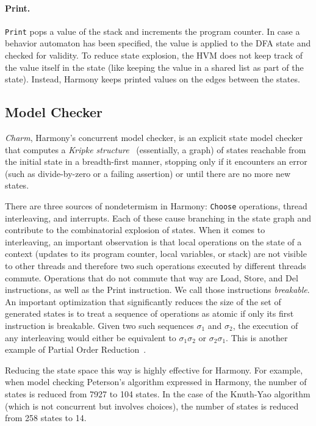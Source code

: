 \documentclass[twocolumn]{article}
\begin{document}
\paragraph{Print.}  \texttt{Print} pops a value of the stack and increments
the program counter.  In case a behavior automaton has been specified, the
value is applied to the DFA state and checked for validity.
To reduce state explosion, the HVM does not keep track of the value itself
in the state (like keeping the value in a shared list as part of the state).
Instead, Harmony keeps printed values on the edges between the states.

\subsection{Model Checker}

\emph{Charm}, Harmony's concurrent model checker, is an explicit state model
checker that computes a \emph{Kripke structure}~\cite{Kripke1963}
(essentially, a graph) of states reachable
from the initial state in a breadth-first manner, stopping only if
it encounters an error (such as divide-by-zero or a failing assertion)
or until there are no more new states.

There are three sources of nondetermism in Harmony: \texttt{Choose}
operations, thread interleaving, and interrupts.
Each of these cause branching in the state graph and contribute
to the combinatorial explosion of states.
When it comes to interleaving, an important observation is that
local operations on the state of a context (updates to its program
counter, local variables, or stack) are not visible to other threads
and therefore two such operations executed by different threads
commute.
Operations that do not commute that way are Load, Store, and Del
instructions, as well as the Print instruction.  We call those
instructions \emph{breakable}.
An important optimization that significantly
reduces the size of the set of generated states is to treat a
sequence of operations as atomic if only its first instruction
is breakable.  Given two such sequences $\sigma_1$ and $\sigma_2$,
the execution of any interleaving would either be equivalent to
$\sigma_1\sigma_2$ or $\sigma_2\sigma_1$.
This is another example of Partial Order Reduction~\cite{Val91}.

Reducing the state space this way is highly effective for Harmony.
For example, when model checking Peterson's algorithm expressed in
Harmony, the number of states is reduced from 7927 to 104 states.
In the case of the Knuth-Yao algorithm (which is not concurrent but
involves choices), the number of states is reduced from 258 states
to 14.
\end{document}
